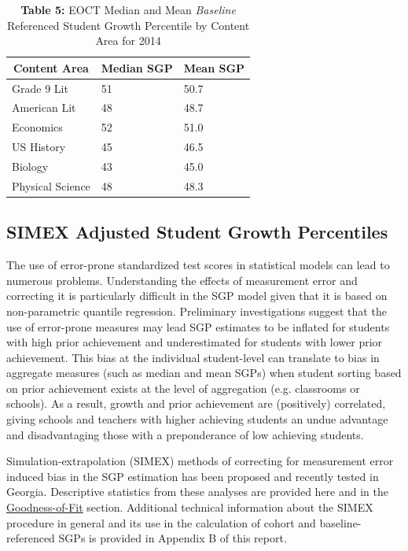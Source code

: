 \documentclass[12pt]{article}
\begin{document}
\begin{table}[H]
\caption*{\textbf{Table 5:} EOCT Median and Mean \emph{Baseline} Referenced Student Growth Percentile by Content Area for 2014\label{}} 
\begin{center}
\begin{tabular}{lll}
\hline\hline
\multicolumn{1}{c}{Content Area}&\multicolumn{1}{c}{Median SGP}&\multicolumn{1}{c}{Mean SGP}\tabularnewline
\hline
Grade 9 Lit&51&50.7\tabularnewline
American Lit&48&48.7\tabularnewline
Economics&52&51.0\tabularnewline
US History&45&46.5\tabularnewline
Biology&43&45.0\tabularnewline
Physical Science&48&48.3\tabularnewline
\hline
\end{tabular}\end{center}

\end{table}

\subsection{SIMEX Adjusted Student Growth
Percentiles}\label{simex-adjusted-student-growth-percentiles}

The use of error-prone standardized test scores in statistical models
can lead to numerous problems. Understanding the effects of measurement
error and correcting it is particularly difficult in the SGP model given
that it is based on non-parametric quantile regression. Preliminary
investigations suggest that the use of error-prone measures may lead SGP
estimates to be inflated for students with high prior achievement and
underestimated for students with lower prior achievement. This bias at
the individual student-level can translate to bias in aggregate measures
(such as median and mean SGPs) when student sorting based on prior
achievement exists at the level of aggregation (e.g. classrooms or
schools). As a result, growth and prior achievement are (positively)
correlated, giving schools and teachers with higher achieving students
an undue advantage and disadvantaging those with a preponderance of low
achieving students.

Simulation-extrapolation (SIMEX) methods of correcting for measurement
error induced bias in the SGP estimation has been proposed and recently
tested in Georgia. Descriptive statistics from these analyses are
provided here and in the \hyperref[goodness-of-fit]{Goodness-of-Fit}
section. Additional technical information about the SIMEX procedure in
general and its use in the calculation of cohort and baseline-referenced
SGPs is provided in Appendix B of this report.
\end{document}
